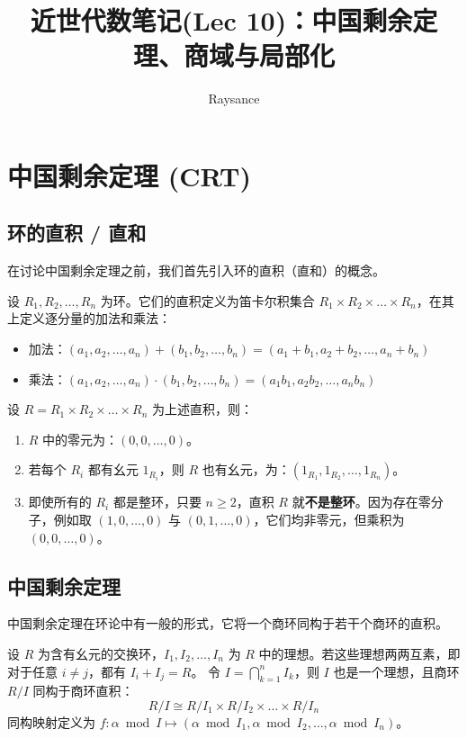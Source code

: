 \documentclass[11pt]{article}
\title{近世代数笔记(Lec 10)：中国剩余定理、商域与局部化}
\author{Raysance}
\date{}
\begin{document}
\maketitle

\section{中国剩余定理 (CRT) }

\subsection{环的直积 / 直和}
在讨论中国剩余定理之前，我们首先引入环的直积（直和）的概念。

\begin{cndefinition}[环的直积]
设 $R_1, R_2, \dots, R_n$ 为环。它们的直积定义为笛卡尔积集合 $R_1 \times R_2 \times \dots \times R_n$，在其上定义逐分量的加法和乘法：
\begin{itemize}
    \item 加法：$(a_1, a_2, \dots, a_n) + (b_1, b_2, \dots, b_n) = (a_1+b_1, a_2+b_2, \dots, a_n+b_n)$
    \item 乘法：$(a_1, a_2, \dots, a_n) \cdot (b_1, b_2, \dots, b_n) = (a_1 b_1, a_2 b_2, \dots, a_n b_n)$
\end{itemize}
\end{cndefinition}

\begin{cnproperty}
设 $R = R_1 \times R_2 \times \dots \times R_n$ 为上述直积，则：
\begin{enumerate}
    \item $R$ 中的零元为：$(0, 0, \dots, 0)$。
    \item 若每个 $R_i$ 都有幺元 $1_{R_i}$，则 $R$ 也有幺元，为：$(1_{R_1}, 1_{R_2}, \dots, 1_{R_n})$。
    \item 即使所有的 $R_i$ 都是整环，只要 $n \ge 2$，直积 $R$ 就\textbf{不是整环}。因为存在零分子，例如取 $(1, 0, \dots, 0)$ 与 $(0, 1, \dots, 0)$，它们均非零元，但乘积为 $(0, 0, \dots, 0)$。
\end{enumerate}
\end{cnproperty}

\subsection{中国剩余定理}
中国剩余定理在环论中有一般的形式，它将一个商环同构于若干个商环的直积。

\begin{cntheorem}
设 $R$ 为含有幺元的交换环，$I_1, I_2, \dots, I_n$ 为 $R$ 中的理想。若这些理想两两互素，即对于任意 $i \neq j$，都有 $I_i + I_j = R$。
令 $I = \bigcap_{k=1}^n I_k$，则 $I$ 也是一个理想，且商环 $R/I$ 同构于商环直积：
$$R/I \cong R/I_1 \times R/I_2 \times \dots \times R/I_n$$
同构映射定义为 $f: \alpha \bmod I \mapsto (\alpha \bmod I_1, \alpha \bmod I_2, \dots, \alpha \bmod I_n)$。
\end{cntheorem}
\end{document}

